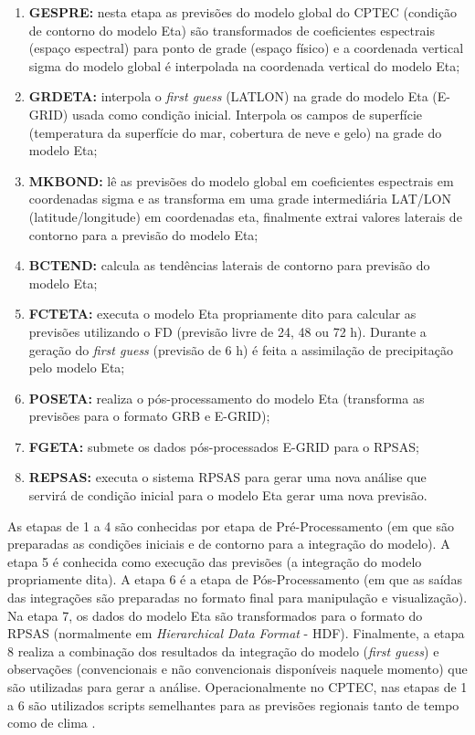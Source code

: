 \begin{enumerate}[1.]
\item \textbf{GESPRE:} nesta etapa as previsões do modelo global do CPTEC (condição de contorno do modelo Eta) são transformados de coeficientes espectrais (espaço espectral) para ponto de grade (espaço físico) e a coordenada vertical sigma do modelo global é interpolada na coordenada vertical do modelo Eta;
\item \textbf{GRDETA:} interpola o \textit{first guess} (LATLON) na grade do modelo Eta (E-GRID) usada como condição inicial. Interpola os campos de superfície (temperatura da superfície do mar, cobertura de neve e gelo) na grade do modelo Eta;
\item \textbf{MKBOND:} lê as previsões do modelo global em coeficientes espectrais em coordenadas sigma e as transforma em uma grade intermediária LAT/LON (latitude/longitude) em coordenadas eta, finalmente extrai valores laterais de contorno para a previsão do modelo Eta;
\item \textbf{BCTEND:} calcula as tendências laterais de contorno para previsão do modelo Eta;
\item \textbf{FCTETA:} executa o modelo Eta propriamente dito para calcular as previsões utilizando o FD (previsão livre de 24, 48 ou 72 h). Durante a geração do \textit{first guess} (previsão de 6 h) é feita a assimilação de precipitação pelo modelo Eta;
\item \textbf{POSETA:} realiza o pós-processamento do modelo Eta (transforma as previsões para o formato GRB e E-GRID);
\item \textbf{FGETA:}  submete os dados pós-processados E-GRID para o RPSAS;
\item \textbf{REPSAS:} executa o sistema RPSAS para gerar uma nova análise que servirá de condição inicial para o modelo Eta gerar uma nova previsão.
\end{enumerate}

As etapas de 1 a 4 são conhecidas por etapa de Pré-Processamento (em que são preparadas as condições iniciais e de contorno para a integração do modelo). A etapa 5 é conhecida como execução das previsões (a integração do modelo propriamente dita). A etapa 6 é a etapa de Pós-Processamento (em que as saídas das integrações são preparadas no formato final para manipulação e visualização). Na etapa 7, os dados do modelo Eta são transformados para o formato do RPSAS (normalmente em \textit{Hierarchical Data Format} - HDF). Finalmente, a etapa 8 realiza a combinação dos resultados da integração do modelo (\textit{first guess}) e observações (convencionais e não convencionais disponíveis naquele momento) que são utilizadas para gerar a análise. Operacionalmente no CPTEC, nas etapas de 1 a 6 são utilizados scripts semelhantes para as previsões regionais tanto de tempo como de clima \cite{fernandez10}.


